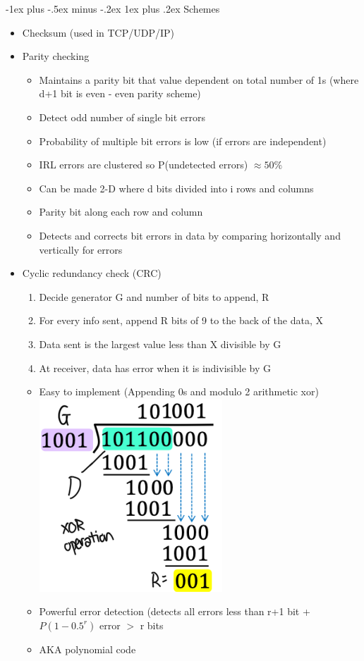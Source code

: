 \documentclass{article}
\makeatletter
\renewcommand{\subsubsection}{\@startsection{subsubsection}{3}{0mm}%
    {-1ex plus -.5ex minus -.2ex}%
    {1ex plus .2ex}%
{\normalfont\small\bfseries}}%
\makeatother
\begin{document}
\begin{multicols*}{4}
\subsubsection{Schemes}
\begin{itemize}
	\item Checksum (used in TCP/UDP/IP)
	\item Parity checking
	\begin{itemize}
		\item Maintains a parity bit that value dependent on total number of 1s (where d+1 bit is even - even parity scheme)
		\item Detect odd number of single bit errors
		\item Probability of multiple bit errors is low (if errors are independent)
		\item IRL errors are clustered so P(undetected errors) $\approx 50\%$
		\item Can be made 2-D where d bits divided into i rows and columns
		\item Parity bit along each row and column
		\item Detects and corrects bit errors in data by comparing horizontally and vertically for errors
	\end{itemize}
	\item Cyclic redundancy check (CRC)
	\begin{enumerate}
		\item Decide generator G and number of bits to append, R
		\item For every info sent, append R bits of 9 to the back of the data, X
		\item Data sent is the largest value less than X divisible by G
		\item At receiver, data has error when it is indivisible by G
	\end{enumerate}
	\begin{itemize}
		\item Easy to implement (Appending 0s and modulo 2 arithmetic xor)
		\\
		\includegraphics[scale=0.24]{CRC-example}
		\item Powerful error detection (detects all errors less than r+1 bit + $P(1-0.5^{r})$ error $>$ r bits
		\item AKA polynomial code
	\end{itemize}
\end{itemize}

\end{multicols*}
\end{document}
